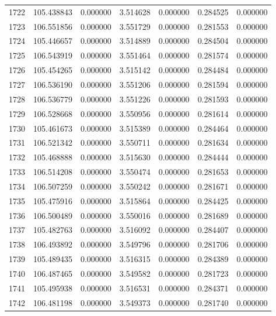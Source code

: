 \begin{tabular}{rrrrrrr}
1722 & 105.438843 &    0.000000 &  3.514628 &   0.000000 &   0.284525 &  0.000000 \\
1723 & 106.551856 &    0.000000 &  3.551729 &   0.000000 &   0.281553 &  0.000000 \\
1724 & 105.446657 &    0.000000 &  3.514889 &   0.000000 &   0.284504 &  0.000000 \\
1725 & 106.543919 &    0.000000 &  3.551464 &   0.000000 &   0.281574 &  0.000000 \\
1726 & 105.454265 &    0.000000 &  3.515142 &   0.000000 &   0.284484 &  0.000000 \\
1727 & 106.536190 &    0.000000 &  3.551206 &   0.000000 &   0.281594 &  0.000000 \\
1728 & 106.536779 &    0.000000 &  3.551226 &   0.000000 &   0.281593 &  0.000000 \\
1729 & 106.528668 &    0.000000 &  3.550956 &   0.000000 &   0.281614 &  0.000000 \\
1730 & 105.461673 &    0.000000 &  3.515389 &   0.000000 &   0.284464 &  0.000000 \\
1731 & 106.521342 &    0.000000 &  3.550711 &   0.000000 &   0.281634 &  0.000000 \\
1732 & 105.468888 &    0.000000 &  3.515630 &   0.000000 &   0.284444 &  0.000000 \\
1733 & 106.514208 &    0.000000 &  3.550474 &   0.000000 &   0.281653 &  0.000000 \\
1734 & 106.507259 &    0.000000 &  3.550242 &   0.000000 &   0.281671 &  0.000000 \\
1735 & 105.475916 &    0.000000 &  3.515864 &   0.000000 &   0.284425 &  0.000000 \\
1736 & 106.500489 &    0.000000 &  3.550016 &   0.000000 &   0.281689 &  0.000000 \\
1737 & 105.482763 &    0.000000 &  3.516092 &   0.000000 &   0.284407 &  0.000000 \\
1738 & 106.493892 &    0.000000 &  3.549796 &   0.000000 &   0.281706 &  0.000000 \\
1739 & 105.489435 &    0.000000 &  3.516315 &   0.000000 &   0.284389 &  0.000000 \\
1740 & 106.487465 &    0.000000 &  3.549582 &   0.000000 &   0.281723 &  0.000000 \\
1741 & 105.495938 &    0.000000 &  3.516531 &   0.000000 &   0.284371 &  0.000000 \\
1742 & 106.481198 &    0.000000 &  3.549373 &   0.000000 &   0.281740 &  0.000000 \\

\end{tabular}
